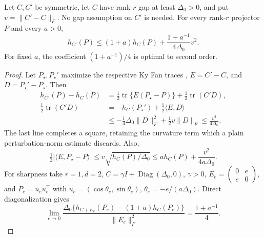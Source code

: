 \begin{lemma}
\label{lem:excess-drift}
Let $C,C'$ be symmetric, let $C$ have rank-$r$ gap at least $\Delta_0>0$,
and put $v=\|C'-C\|_F$. No gap assumption on $C'$ is needed. For every
rank-$r$ projector $P$ and every $a>0$,
\begin{equation}
 h_{C'}(P)\le(1+a)h_C(P)+\frac{1+a^{-1}}{4\Delta_0}v^2.
 \label{eq:excess-drift}
\end{equation}
For fixed $a$, the coefficient $(1+a^{-1})/4$ is optimal to second order.
\end{lemma}
\begin{proof}
Let $P_\star,P_\star'$ maximize the respective Ky Fan traces
\cite{fan1951maximum}, $E=C'-C$, and $D=P_\star'-P_\star$. Then
\begin{align}
 h_{C'}(P)-h_C(P)
 &=\tfrac12\operatorname{tr}\{E(P_\star-P)\}
                      +\tfrac12\operatorname{tr}(C'D),\\
 \tfrac12\operatorname{tr}(C'D)
 &=-h_C(P_\star')+\tfrac12\langle E,D\rangle\\
 &\le-\tfrac14\Delta_0\|D\|_F^2+\tfrac12v\|D\|_F
 \le\frac{v^2}{4\Delta_0}.
\end{align}
The last line completes a square, retaining the curvature term which a
plain perturbation-norm estimate discards. Also,
\begin{equation}
 \tfrac12|\langle E,P_\star-P\rangle|
 \le v\sqrt{h_C(P)/\Delta_0}
 \le a h_C(P)+\frac{v^2}{4a\Delta_0}.
\end{equation}
For sharpness take $r=1,d=2$,
$C=\gamma I+\operatorname{Diag}(\Delta_0,0)$, $\gamma>0$,
$E_e=\left(\begin{smallmatrix}0&e\\e&0\end{smallmatrix}\right)$,
and $P_e=u_eu_e^\top$ with $u_e=(\cos\theta_e,\sin\theta_e)$,
$\theta_e=-e/(a\Delta_0)$. Direct diagonalization gives
\begin{equation}
 \lim_{e\to0}\frac{\Delta_0\{h_{C+E_e}(P_e)-(1+a)h_C(P_e)\}}
                         {\|E_e\|_F^2}=\frac{1+a^{-1}}4.
\end{equation}
\end{proof}

